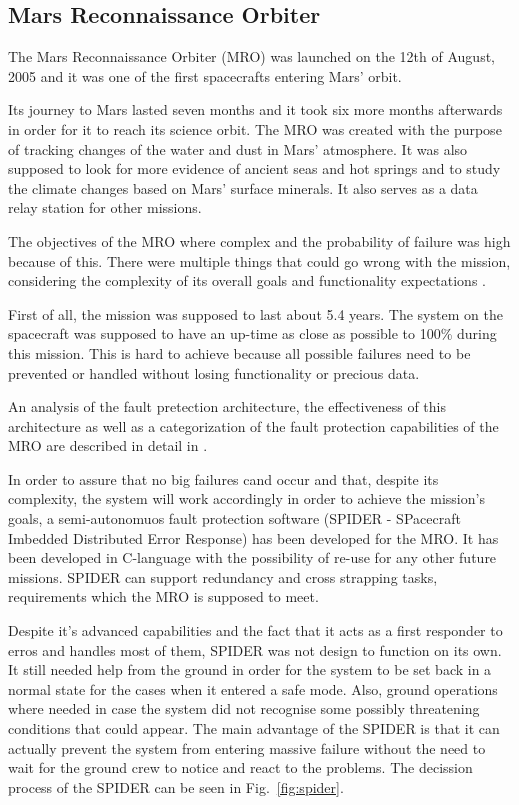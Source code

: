 \subsection{Mars Reconnaissance Orbiter}

The Mars Reconnaissance Orbiter (MRO)\cite{mro-nasa} was launched on the 12th of
August, 2005 and it was one of the first spacecrafts entering Mars' orbit.

Its journey to Mars lasted seven months and it took six more months afterwards
in order for it to reach its science orbit. The MRO was created with the purpose
of tracking changes of the water and dust in Mars' atmosphere. It was also
supposed to look for more evidence of ancient seas and hot springs and to study
the climate changes based on Mars' surface minerals. It also serves as a data
relay station for other missions.

The objectives of the MRO where complex and the probability of failure was high
because of this. There were multiple things that could go wrong with the
mission, considering the complexity of its overall goals and functionality
expectations \cite{tvs}.

First of all, the mission was supposed to last about 5.4 years. The system on
the spacecraft was supposed to have an up-time as close as possible to 100\%
during this mission. This is hard to achieve because all possible failures need
to be prevented or handled without losing functionality or precious data.

An analysis of the fault pretection architecture, the effectiveness of this
architecture as well as a categorization of the fault protection capabilities of
the MRO are described in detail in \cite{surv-nasa-mars}.

In order to assure that no big failures cand occur and that, despite its
complexity, the system will work accordingly in order to achieve the mission's
goals, a semi-autonomuos fault protection software (SPIDER - SPacecraft Imbedded
Distributed Error Response) has been developed for the MRO. It has been
developed in C-language with the possibility of re-use for any other future
missions. SPIDER can support redundancy and cross strapping tasks, requirements
which the MRO is supposed to meet.

Despite it's advanced capabilities and the fact that it acts as a first
responder to erros and handles most of them, SPIDER was not design to function
on its own. It still needed help from the ground in order for the system to be
set back in a normal state for the cases when it entered a safe mode. Also,
ground operations where needed in case the system did not recognise some
possibly threatening conditions that could appear. The main advantage of the
SPIDER is that it can actually prevent the system from entering massive failure
without the need to wait for the ground crew to notice and react to the
problems. The decission process of the SPIDER can be seen in
Fig.~\ref{fig:spider}.

